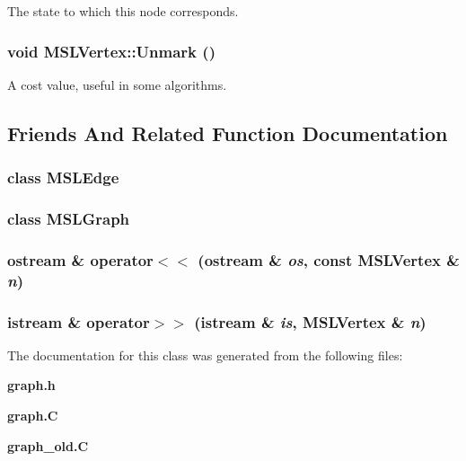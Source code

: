 The state to which this node corresponds.

\subsubsection{\setlength{\rightskip}{0pt plus 5cm}void MSLVertex::Unmark ()\hspace{0.3cm}{\tt  [inline]}}\label{classMSLVertex_a7}


A cost value, useful in some algorithms.



\subsection{Friends And Related Function Documentation}
\subsubsection{\setlength{\rightskip}{0pt plus 5cm}class MSLEdge\hspace{0.3cm}{\tt  [friend]}}\label{classMSLVertex_l0}


\subsubsection{\setlength{\rightskip}{0pt plus 5cm}class MSLGraph\hspace{0.3cm}{\tt  [friend]}}\label{classMSLVertex_l1}


\subsubsection{\setlength{\rightskip}{0pt plus 5cm}ostream \& operator$<$$<$ (ostream \& {\em os}, const MSLVertex \& {\em n})\hspace{0.3cm}{\tt  [friend]}}\label{classMSLVertex_l3}


\subsubsection{\setlength{\rightskip}{0pt plus 5cm}istream \& operator$>$$>$ (istream \& {\em is}, MSLVertex \& {\em n})\hspace{0.3cm}{\tt  [friend]}}\label{classMSLVertex_l2}




The documentation for this class was generated from the following files:\begin{CompactItemize}
\item 
{\bf graph.h}\item 
{\bf graph.C}\item 
{\bf graph\_\-old.C}\end{CompactItemize}
